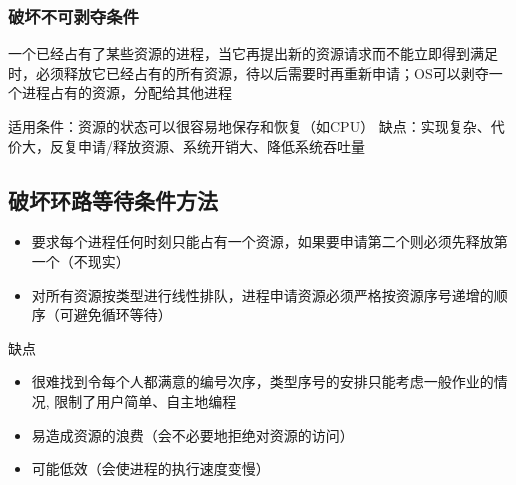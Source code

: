 \subsubsection{破坏不可剥夺条件}
一个已经占有了某些资源的进程，当它再提出新的资源请求而不能立即得到满足时，必须释放它已经占有的所有资源，待以后需要时再重新申请；OS可以剥夺一个进程占有的资源，分配给其他进程

适用条件：资源的状态可以很容易地保存和恢复（如CPU）
缺点：实现复杂、代价大，反复申请/释放资源、系统开销大、降低系统吞吐量

\subsection{破坏环路等待条件方法}
\begin{itemize}
    \item 要求每个进程任何时刻只能占有一个资源，如果要申请第二个则必须先释放第一个（不现实）
    \item 对所有资源按类型进行线性排队，进程申请资源必须严格按资源序号递增的顺序（可避免循环等待）
\end{itemize}

缺点
\begin{itemize}
    \item 很难找到令每个人都满意的编号次序，类型序号的安排只能考虑一般作业的情况, 限制了用户简单、自主地编程
    \item 易造成资源的浪费（会不必要地拒绝对资源的访问）
    \item 可能低效（会使进程的执行速度变慢）
\end{itemize}

